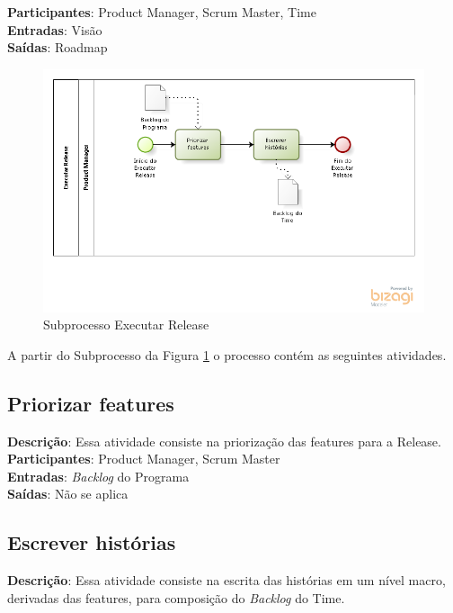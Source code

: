   \textbf{Participantes}: Product Manager, Scrum Master, Time \\
  
  \textbf{Entradas}: Visão \\
  
  \textbf{Saídas}:  Roadmap\\

\begin{figure}[!htb]
\centering
\includegraphics[scale=0.7]{figuras/release.png}
\caption{Subprocesso Executar Release}
\label{fig:release}
\end{figure}
  
A partir do Subprocesso da Figura \ref{fig:release} o processo contém as seguintes atividades.

\subsection{Priorizar features}
  \textbf{Descrição}: Essa atividade consiste na priorização das features para a Release. \\
  
  \textbf{Participantes}: Product Manager, Scrum Master\\
  
  \textbf{Entradas}: \textit{Backlog} do Programa \\
  
  \textbf{Saídas}:  Não se aplica\\

\subsection{Escrever histórias}
  \textbf{Descrição}: Essa atividade consiste na escrita das histórias em um nível macro, derivadas das features, para composição do \textit{Backlog} do Time. \\
  
